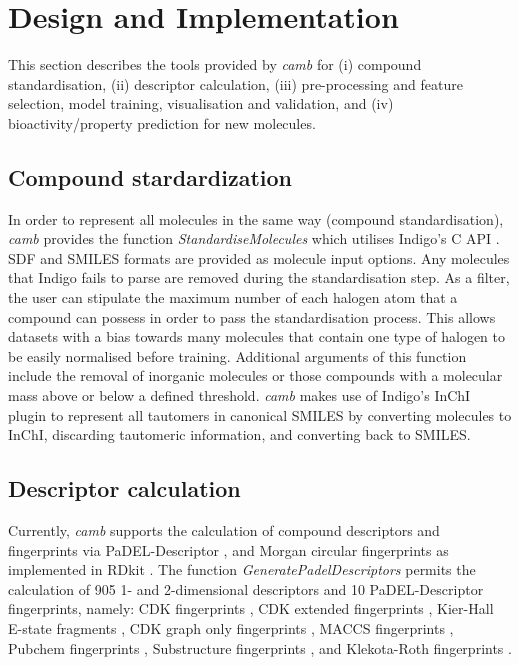 \documentclass[twoside,a4wide,10pt]{article}
\begin{document}
\section*{Design and Implementation}

This section describes the tools provided by {\it camb} 
for (i) compound standardisation, (ii) 
descriptor calculation, 
(iii) pre-processing and feature selection, model training, visualisation and validation, and (iv) bioactivity/property prediction for new molecules.

\subsection{Compound stardardization}
In order to represent all molecules in the same 
way (compound standardisation),
{\it camb}  provides the function {\it StandardiseMolecules} which utilises Indigo's C API \citep{Indigo}.
SDF and SMILES formats are provided as molecule input options. Any molecules that Indigo fails to parse are removed during the standardisation step.
As a filter, the user can stipulate the maximum number of each halogen atom that a compound can possess in order to pass the standardisation process. This allows datasets with a bias towards many molecules that contain one type of halogen to be easily normalised before training.
Additional arguments of this function include the removal of inorganic molecules
or those compounds with a molecular mass above or below a defined threshold.
{\it camb} makes use of Indigo's InChI \citep{inchi} plugin to represent all tautomers in canonical SMILES
by converting molecules to InChI, discarding tautomeric information, and converting back to SMILES.  

\subsection{Descriptor calculation} 

Currently, {\it camb} supports the calculation of compound descriptors and fingerprints via PaDEL-Descriptor \citep{padel},
and Morgan circular fingerprints \citep{extended_fp} as implemented in RDkit \citep{rdkit}.
The function {\it GeneratePadelDescriptors} permits the calculation of 905 1- and 2-dimensional descriptors and 10 PaDEL-Descriptor fingerprints, namely: 
CDK fingerprints \citep{CDK}, CDK extended fingerprints \citep{CDK}, Kier-Hall E-state fragments \cite{state_fp}, CDK graph only fingerprints \citep{CDK}, MACCS fingerprints \citep{maccs},
Pubchem fingerprints \citep{pubchem}, Substructure fingerprints \citep{obabel}, and Klekota-Roth fingerprints \citep{privileged_substructures}.
\end{document}
